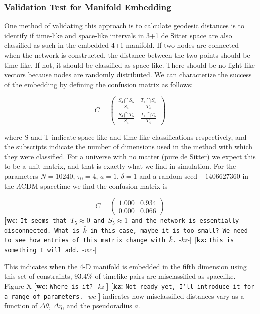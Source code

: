 \documentclass[preprint,notitlepage,amsmath,amssymb,floatfix]{revtex4-1}
\newcommand{\XXX}[3]{{\bf [#1: } {\tt #3} {\it -#2-}{\bf ]}}
\begin{document}
\subsubsection{Validation Test for Manifold Embedding}
One method of validating this approach is to calculate geodesic distances is to identify if time-like and space-like intervals in 3+1 de Sitter space are also classified as such in the embedded 4+1 manifold.  
If two nodes are connected when the network is constructed, the distance between the two points should be time-like.  
If not, it should be classified as space-like.  
There should be no light-like vectors because nodes are randomly distributed.
We can characterize the success of the embedding by defining the confusion matrix as follows:

\begin{equation}
C = \left( \begin{array}{cc}
\frac{S_4 \bigcap S_5}{S_4} & \frac{T_4 \bigcap S_5}{T_4} \\
\frac{S_4 \bigcap T_5}{S_4} & \frac{T_4 \bigcap T_5}{T_4} \end{array} \right)
\end{equation}

where S and T indicate space-like and time-like classifications respectively, and the subscripts indicate the number of dimensions used in the method with which they were classified.
For a universe with no matter (pure de Sitter) we expect this to be a unit matrix, and that is exactly what we find in simulation.
For the parameters $N = 10240$, $\tau_0 = 4$, $a = 1$, $\delta = 1$ and a random seed $-1406627360$ in the $\Lambda$CDM spacetime  we find the confusion matrix is

\begin{equation}
C = \left( \begin{array}{cc}
1.000 & 0.934 \\
0.000 & 0.066 \end{array} \right)
\end{equation}
\XXX{wc}{kz}{It seems that $T_5\approx0$ and $S_5\approx1$ and the network is essentially disconnected. What is $\bar{k}$ in this case, maybe it is too small? We need to see how entries of this matrix change with $\bar{k}$.} \XXX{kz}{wc}{This is something I will add.}

This indicates when the 4-D manifold is embedded in the fifth dimension using this set of constraints, $93.4\%$ of timelike pairs are misclassified as spacelike.
Figure X \XXX{wc}{kz}{Where is it?} \XXX{kz}{wc}{Not ready yet, I'll introduce it for a range of parameters.} indicates how misclassified distances vary as a function of $\Delta\theta$, $\Delta\eta$, and the pseudoradius $a$.
\end{document}
